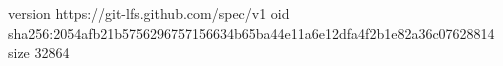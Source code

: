 version https://git-lfs.github.com/spec/v1
oid sha256:2054afb21b5756296757156634b65ba44e11a6e12dfa4f2b1e82a36c07628814
size 32864
